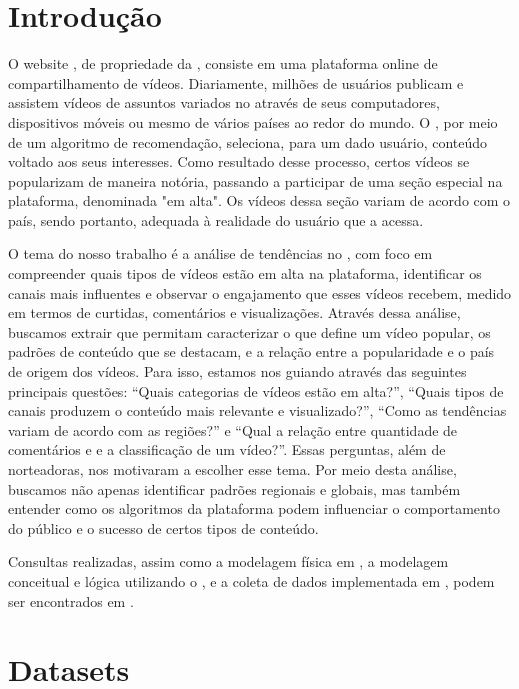 \chapter{Introdução}

  O website , de propriedade da , consiste em uma plataforma online de compartilhamento de vídeos.
  Diariamente, milhões de usuários publicam e assistem vídeos de assuntos variados no  através de seus computadores,
  dispositivos móveis ou mesmo  de vários países ao redor do mundo. O , por meio de um
  algoritmo de recomendação, seleciona, para um dado usuário, conteúdo voltado aos seus interesses. Como resultado desse processo,
  certos vídeos se popularizam de maneira notória, passando a participar de uma seção especial na plataforma, denominada "em alta".
  Os vídeos dessa seção variam de acordo com o país, sendo portanto, adequada à realidade do usuário que a acessa.

  O tema do nosso trabalho é a análise de tendências no , com foco em compreender quais tipos de vídeos estão em alta na plataforma, identificar os canais mais influentes e observar o engajamento que esses vídeos recebem, medido em termos de curtidas, comentários e visualizações. Através dessa análise, buscamos extrair  que permitam caracterizar o que define um vídeo popular, os padrões de conteúdo que se destacam, e a relação entre a popularidade e o país de origem dos vídeos. Para isso, estamos nos guiando através das seguintes principais questões: ``Quais categorias de vídeos estão em alta?'', ``Quais tipos de canais produzem o conteúdo mais relevante e visualizado?'', ``Como as tendências variam de acordo com as regiões?'' e ``Qual a relação entre quantidade de comentários e  e a classificação de um vídeo?''. Essas perguntas, além de norteadoras, nos motivaram a escolher esse tema. Por meio desta análise, buscamos não apenas identificar padrões regionais e globais, mas também entender como os algoritmos da plataforma podem influenciar o comportamento do público e o sucesso de certos tipos de conteúdo.

  Consultas realizadas, assim como a modelagem física em , a modelagem conceitual e lógica utilizando
  o , e a coleta de dados implementada em , podem ser encontrados
  em \cite{our-YoutubeScraperDataBank}.

\chapter{Datasets}

